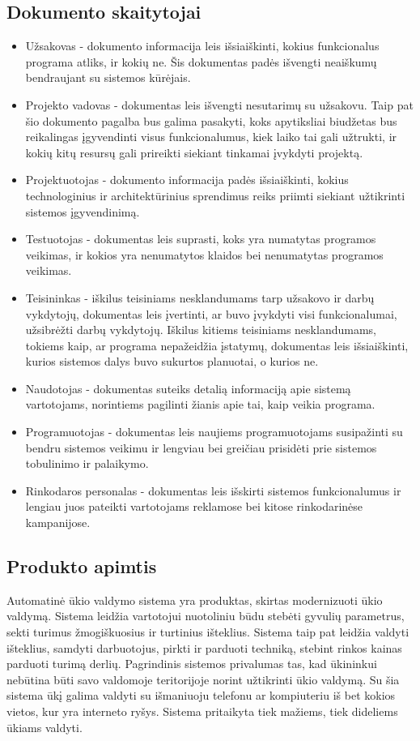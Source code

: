 \documentclass[oneside]{VUMIFPSkursinis}
\begin{document}
\subsection{Dokumento skaitytojai}
\begin{itemize}
	\item Užsakovas - dokumento informacija leis išsiaiškinti, kokius funkcionalus programa atliks, ir kokių ne. Šis dokumentas padės išvengti neaiškumų bendraujant su sistemos kūrėjais.
	\item Projekto vadovas - dokumentas leis išvengti nesutarimų su užsakovu. Taip pat šio dokumento pagalba bus galima pasakyti, koks apytiksliai biudžetas bus reikalingas įgyvendinti visus funkcionalumus, kiek laiko tai gali užtrukti, ir kokių kitų resursų gali prireikti siekiant tinkamai įvykdyti projektą.
	\item Projektuotojas - dokumento informacija padės išsiaiškinti, kokius technologinius ir architektūrinius sprendimus reiks priimti siekiant užtikrinti sistemos įgyvendinimą.
	\item Testuotojas - dokumentas leis suprasti, koks yra numatytas programos veikimas, ir kokios yra nenumatytos klaidos bei nenumatytas programos veikimas.
	\item Teisininkas - iškilus teisiniams nesklandumams tarp užsakovo ir darbų vykdytojų, dokumentas leis įvertinti, ar buvo įvykdyti visi funkcionalumai, užsibrėžti darbų vykdytojų. Iškilus kitiems teisiniams nesklandumams, tokiems kaip, ar programa nepažeidžia įstatymų, dokumentas leis išsiaiškinti, kurios sistemos dalys buvo sukurtos planuotai, o kurios ne.
	\item Naudotojas - dokumentas suteiks detalią informaciją apie sistemą vartotojams, norintiems pagilinti žianis apie tai, kaip veikia programa.
	\item Programuotojas - dokumentas leis naujiems programuotojams susipažinti su bendru sistemos veikimu ir lengviau bei greičiau prisidėti prie sistemos tobulinimo ir palaikymo.
	\item Rinkodaros personalas - dokumentas leis išskirti sistemos funkcionalumus ir lengiau juos pateikti vartotojams reklamose bei kitose rinkodarinėse kampanijose.
\end{itemize}
\pagebreak
\subsection{Produkto apimtis} Automatinė ūkio valdymo sistema yra produktas, skirtas modernizuoti ūkio valdymą. Sistema leidžia vartotojui nuotoliniu būdu stebėti gyvulių parametrus, sekti turimus žmogiškuosius ir turtinius išteklius. Sistema taip pat leidžia valdyti išteklius, samdyti darbuotojus, pirkti ir parduoti techniką, stebint rinkos kainas parduoti turimą derlių. Pagrindinis sistemos privalumas tas, kad ūkininkui nebūtina būti savo valdomoje teritorijoje norint užtikrinti ūkio valdymą. Su šia sistema ūkį galima valdyti su išmaniuoju telefonu ar kompiuteriu iš bet kokios vietos, kur yra interneto ryšys. Sistema pritaikyta tiek mažiems, tiek dideliems ūkiams valdyti. 
\end{document}
